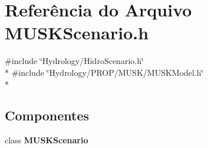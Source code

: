 \section{Referência do Arquivo M\+U\+S\+K\+Scenario.\+h}
\label{_m_u_s_k_scenario_8h}
{\ttfamily \#include \char`\"{}Hydrology/\+Hidro\+Scenario.\+h\char`\"{}}\\*
{\ttfamily \#include \char`\"{}Hydrology/\+P\+R\+O\+P/\+M\+U\+S\+K/\+M\+U\+S\+K\+Model.\+h\char`\"{}}\\*
\subsection*{Componentes}
\begin{DoxyCompactItemize}
\item 
class {\bf M\+U\+S\+K\+Scenario}
\end{DoxyCompactItemize}
